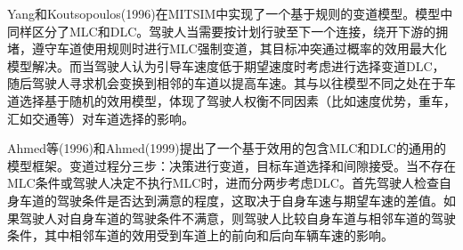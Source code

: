 Yang和Koutsopoulos(1996)在MITSIM中实现了一个基于规则的变道模型\cite{Yang1996}。模型中同样区分了MLC和DLC。驾驶人当需要按计划行驶至下一个连接，绕开下游的拥堵，遵守车道使用规则时进行MLC强制变道，其目标冲突通过概率的效用最大化模型解决。而当驾驶人认为引导车速度低于期望速度时考虑进行选择变道DLC，随后驾驶人寻求机会变换到相邻的车道以提高车速。其与以往模型不同之处在于车道选择基于随机的效用模型，体现了驾驶人权衡不同因素（比如速度优势，重车，汇如交通等）对车道选择的影响。

Ahmed等(1996)和Ahmed(1999)提出了一个基于效用的包含MLC和DLC的通用的模型框架\cite{Ahmed1996,Ahmed1999}。变道过程分三步：决策进行变道，目标车道选择和间隙接受。当不存在MLC条件或驾驶人决定不执行MLC时，进而分两步考虑DLC。首先驾驶人检查自身车道的驾驶条件是否达到满意的程度，这取决于自身车速与期望车速的差值。如果驾驶人对自身车道的驾驶条件不满意，则驾驶人比较自身车道与相邻车道的驾驶条件，其中相邻车道的效用受到车道上的前向和后向车辆车速的影响。
 
